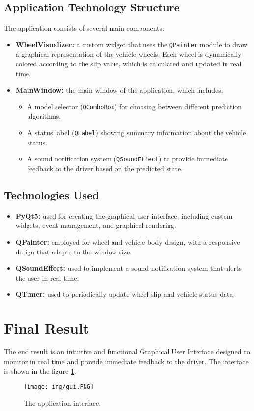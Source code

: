 \documentclass[a4paper,final,12pt]{report}
\begin{document}
\subsection{Application Technology Structure}
The application consists of several main components:
\begin{itemize}
    \item \textbf{WheelVisualizer:} a custom widget that uses the \texttt{QPainter} module to draw a graphical representation of the vehicle wheels. Each wheel is dynamically colored according to the slip value, which is calculated and updated in real time.
    \item \textbf{MainWindow:} the main window of the application, which includes:
    \begin{itemize}
        \item A model selector (\texttt{QComboBox}) for choosing between different prediction algorithms.
        \item A status label (\texttt{QLabel}) showing summary information about the vehicle status.
        \item A sound notification system (\texttt{QSoundEffect}) to provide immediate feedback to the driver based on the predicted state.
    \end{itemize}
\end{itemize}

\subsection{Technologies Used}
\begin{itemize}
    \item \textbf{PyQt5:} used for creating the graphical user interface, including custom widgets, event management, and graphical rendering.
    \item \textbf{QPainter:} employed for wheel and vehicle body design, with a responsive design that adapts to the window size.
    \item \textbf{QSoundEffect:} used to implement a sound notification system that alerts the user in real time.
    \item \textbf{QTimer:} used to periodically update wheel slip and vehicle status data.
\end{itemize}

\newpage
\section{Final Result}
The end result is an intuitive and functional Graphical User Interface designed to monitor in real time and provide immediate feedback to the driver. The interface is shown in the figure \ref{fig:GUI}.
\begin{figure}[H]
\centering
\texttt{[image: img/gui.PNG]}
\caption{The application interface.}
\label{fig:GUI}
\end{figure}
\end{document}
